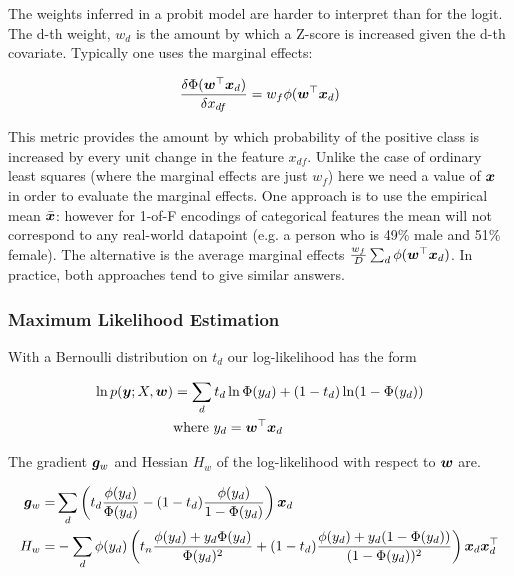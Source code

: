 The weights inferred in a probit model are harder to interpret than for the logit. The d-th weight, $w_d$ is the amount by which a Z-score is increased given the d-th covariate. Typically one uses the marginal effects:

\begin{equation}
\frac{\delta \Phi(\bm w^\top\bm x_d)}{\delta x_{df}} = w_f \phi(\bm w^\top\bm x_d)
\end{equation}

This metric provides the amount by which probability of the positive class is increased by every unit change in the feature $x_{df}$. Unlike the case of ordinary least squares (where the marginal effects are just $w_f$) here we need a value of $\bm x$ in order to evaluate the marginal effects. One approach is to use the empirical mean $\bar{\bm x}$: however for 1-of-F encodings of categorical features the mean will not correspond to any real-world datapoint (e.g. a person who is 49\% male and 51\% female). The alternative is the average marginal effects $\frac{w_f}{D}\sum_d\phi(\bm w^\top\bm x_d)$. In practice, both approaches tend to give similar answers.



\subsubsection*{Maximum Likelihood Estimation}
With a Bernoulli distribution on $t_d$ our log-likelihood has the form

\begin{align}
\ln p(\bm y; X, \bm w) & = \sum_d t_d \ln \Phi(y_d) + (1 - t_d) \ln (1 - \Phi(y_d)) \\
& \text{where } y_d = \bm w^\top\bm x_d
\end{align}

The gradient $\bm g_w$ and Hessian $H_w$ of the log-likelihood with respect to $\bm w$ are.

\begin{align}
\bm g_w = & \sum_d \left( t_d \frac{\phi(y_d)}{\Phi(y_d)} - (1 - t_d) \frac{\phi(y_d)}{1 - \Phi(y_d)} \right) \bm x_d \label{eqn:probit-gradient}\\
H_w = & - \sum_d \phi(y_d) \left(
    t_n \frac{\phi(y_d) + y_d \Phi(y_d)}{\Phi(y_d)^2} + (1-t_d) \frac{\phi(y_d) + y_d (1-\Phi(y_d))}{(1 - \Phi(y_d))^2}
\right) \bm x_d \bm x_d^\top \label{eqn:probit-hessian}
\end{align}

